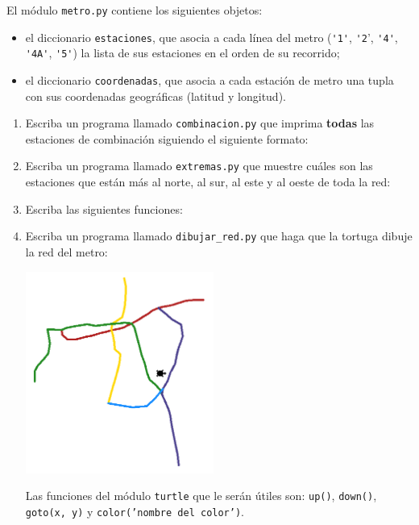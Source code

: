 El módulo \texttt{metro.py} contiene los siguientes objetos:
\begin{itemize}[leftmargin=0pt]
  \item el diccionario \verb!estaciones!,
    que asocia a cada línea del metro
    (\verb!'1'!, \verb!'2!', \verb!'4'!, \verb!'4A'!, \verb!'5'!)
    la lista de sus estaciones
    en el orden de su recorrido;
  \item el diccionario \verb!coordenadas!,
    que asocia a cada estación de metro
    una tupla con sus coordenadas geográficas
    (latitud y longitud).
\end{itemize}

\begin{enumerate}[leftmargin=0pt,label=\emph{\alph*})]
  \item
    Escriba un programa llamado \texttt{combinacion.py}
    que imprima \textbf{todas} las estaciones de combinación
    siguiendo el siguiente formato:
    

  \item
    Escriba un programa llamado \texttt{extremas.py}
    que muestre cuáles son las estaciones que están
    más al norte, al sur, al este y al oeste
    de toda la red:
    

  \newpage
  \item
    Escriba las siguientes funciones:
    

  \newpage
  \item
    Escriba un programa llamado \verb!dibujar_red.py!
    que haga que la tortuga dibuje la red del metro:

    \includegraphics[height=250px]{metro/red1}

    Las funciones del módulo \texttt{turtle}
    que le serán útiles son:
    \texttt{up()},
    \texttt{down()},
    \texttt{goto(x, y)} y
    \texttt{color('nombre del color')}.


\end{enumerate}

